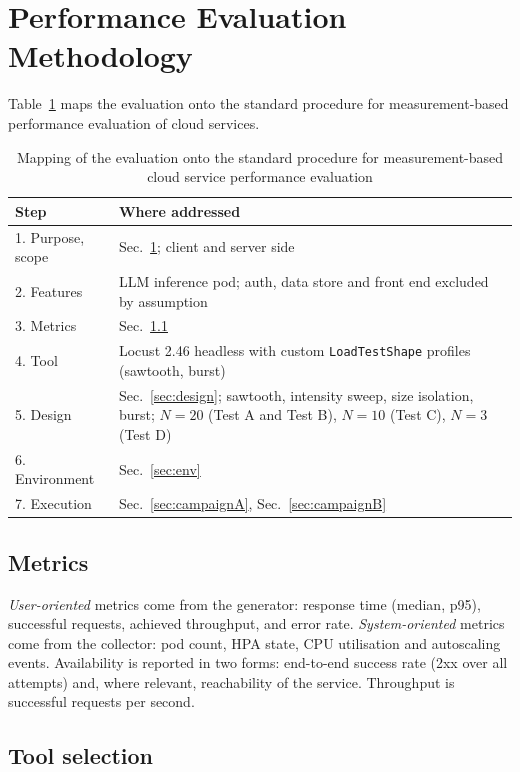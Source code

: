 \documentclass[conference]{IEEEtran}
\newcommand{\code}[1]{\texttt{#1}}
\begin{document}
\section{Performance Evaluation Methodology}
\label{sec:method}

Table~\ref{tab:procedure} maps the evaluation onto the standard procedure for
measurement-based performance evaluation of cloud services.

\begin{table}[t]
\caption{Mapping of the evaluation onto the standard procedure for
measurement-based cloud service performance evaluation}
\label{tab:procedure}
\centering\small
\begin{tabular}{@{}p{2.35cm}p{5.2cm}@{}}
\toprule
Step & Where addressed \\
\midrule
1. Purpose, scope & Sec.~\ref{sec:method}; client and server side \\
2. Features & LLM inference pod; auth, data store and front end
excluded by assumption \\
3. Metrics & Sec.~\ref{sec:metrics} \\
4. Tool & Locust 2.46 headless with custom \code{LoadTestShape}
profiles (sawtooth, burst) \\
5. Design & Sec.~\ref{sec:design}; sawtooth, intensity sweep, size
isolation, burst; $N{=}20$ (Test A and Test B), $N{=}10$ (Test C),
$N{=}3$ (Test D) \\
6. Environment & Sec.~\ref{sec:env} \\
7. Execution & Sec.~\ref{sec:campaignA}, Sec.~\ref{sec:campaignB} \\
\bottomrule
\end{tabular}
\end{table}

\subsection{Metrics}
\label{sec:metrics}

\emph{User-oriented} metrics come from the generator: response time (median,
p95), successful requests, achieved throughput, and error rate.
\emph{System-oriented} metrics come from the collector: pod count, HPA state,
CPU utilisation and autoscaling events. Availability is reported in two forms:
end-to-end success rate (2xx over all attempts) and, where relevant,
reachability of the service. Throughput is successful requests per second.

\subsection{Tool selection}
\end{document}
